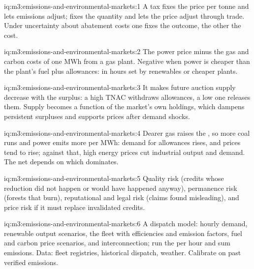 \begin{solution}{iq:m3:emissions-and-environmental-markets:1}
A tax fixes the price per tonne and lets emissions adjust;  fixes the quantity and lets the
price adjust through trade. Under uncertainty about abatement costs one fixes the outcome, the other the
cost.
\end{solution}

\begin{solution}{iq:m3:emissions-and-environmental-markets:2}
The power price minus the gas and carbon costs of one MWh from a gas plant. Negative when power is
cheaper than the plant's fuel plus allowances: in hours set by renewables or cheaper plants.
\end{solution}

\begin{solution}{iq:m3:emissions-and-environmental-markets:3}
It makes future auction supply decrease with the surplus: a high TNAC withdraws allowances, a low one
releases them. Supply becomes a function of the market's own holdings, which dampens persistent
surpluses and supports prices after demand shocks.
\end{solution}

\begin{solution}{iq:m3:emissions-and-environmental-markets:4}
Dearer gas raises the , so more coal runs and power emits more per MWh: demand for
allowances rises, and prices tend to rise; against that, high energy prices cut industrial output and
demand. The net depends on which dominates.
\end{solution}

\begin{solution}{iq:m3:emissions-and-environmental-markets:5}
Quality risk (credits whose reduction did not happen or would have happened anyway), permanence risk
(forests that burn), reputational and legal risk (claims found misleading), and price risk if it must
replace invalidated credits.
\end{solution}

\begin{solution}{iq:m3:emissions-and-environmental-markets:6}
A dispatch model: hourly demand, renewable output scenarios, the fleet with efficiencies and emission
factors, fuel and carbon price scenarios, and interconnection; run the  per hour and sum
emissions. Data: fleet registries, historical dispatch, weather. Calibrate on past verified emissions.
\end{solution}

